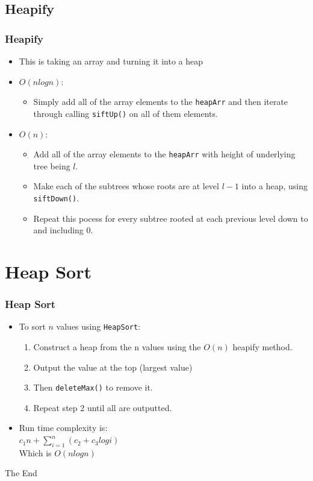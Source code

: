 \documentclass{beamer}
\begin{document}
\subsection{Heapify}
\begin{frame}
\frametitle{Heapify}
\begin{itemize}
\item This is taking an array and turning it into a heap
\item $O(nlogn)$:
\begin{itemize}
\item Simply add all of the array elements to the \texttt{heapArr} and then iterate through calling \texttt{siftUp()} on all of them elements.
\end{itemize}
\item $O(n)$:
\begin{itemize}
\item Add all of the array elements to the \texttt{heapArr} with height of underlying tree being $l$.
\item Make each of the subtrees whose roots are at level $l - 1$ into a heap, using \texttt{siftDown()}.
\item Repeat this pocess for every subtree rooted at each previous level down to and including 0.
\end{itemize}
\end{itemize}
\end{frame}

\section{Heap Sort}
\begin{frame}
\frametitle{Heap Sort}
\begin{itemize}
\item To sort $n$ values using \texttt{HeapSort}:
\begin{enumerate}
\item Construct a heap from the n values using the $O(n)$ {\color{green} heapify} method.
\item Output the value at the top (largest value)
\item Then \texttt{deleteMax()} to remove it.
\item Repeat step 2 until all are outputted.
\end{enumerate}
\item Run time complexity is:\\
$c_1 n + \displaystyle\sum_{i=1}^{n} ( c_2 + c_3logi)$\\
Which is $O(nlogn)$
\end{itemize}
\end{frame}

\begin{frame} 
\Huge{\centerline{The End}}
\end{frame}
\end{document}
